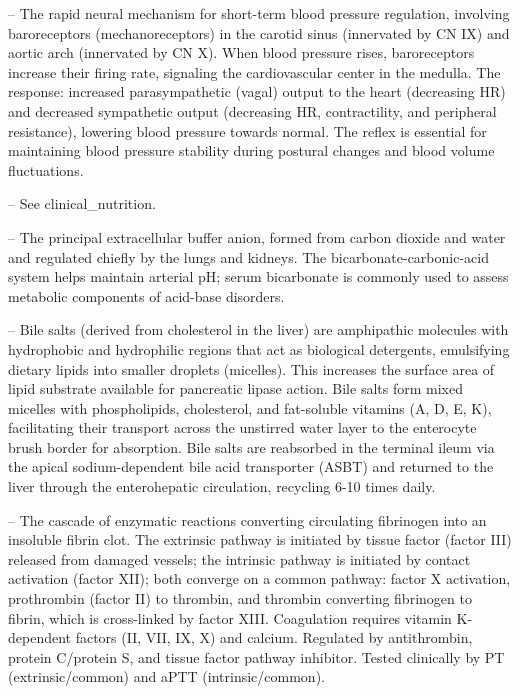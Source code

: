 -- The rapid neural mechanism for short-term blood pressure regulation, involving baroreceptors (mechanoreceptors) in the carotid sinus (innervated by CN IX) and aortic arch (innervated by CN X). When blood pressure rises, baroreceptors increase their firing rate, signaling the cardiovascular center in the medulla. The response: increased parasympathetic (vagal) output to the heart (decreasing HR) and decreased sympathetic output (decreasing HR, contractility, and peripheral resistance), lowering blood pressure towards normal. The reflex is essential for maintaining blood pressure stability during postural changes and blood volume fluctuations.

-- See clinical\_nutrition.

-- The principal extracellular buffer anion, formed from carbon dioxide and water and regulated chiefly by the lungs and kidneys. The bicarbonate-carbonic-acid system helps maintain arterial pH; serum bicarbonate is commonly used to assess metabolic components of acid-base disorders.

-- Bile salts (derived from cholesterol in the liver) are amphipathic molecules with hydrophobic and hydrophilic regions that act as biological detergents, emulsifying dietary lipids into smaller droplets (micelles). This increases the surface area of lipid substrate available for pancreatic lipase action. Bile salts form mixed micelles with phospholipids, cholesterol, and fat-soluble vitamins (A, D, E, K), facilitating their transport across the unstirred water layer to the enterocyte brush border for absorption. Bile salts are reabsorbed in the terminal ileum via the apical sodium-dependent bile acid transporter (ASBT) and returned to the liver through the enterohepatic circulation, recycling 6-10 times daily.

-- The cascade of enzymatic reactions converting circulating fibrinogen into an insoluble fibrin clot. The extrinsic pathway is initiated by tissue factor (factor III) released from damaged vessels; the intrinsic pathway is initiated by contact activation (factor XII); both converge on a common pathway: factor X activation, prothrombin (factor II) to thrombin, and thrombin converting fibrinogen to fibrin, which is cross-linked by factor XIII. Coagulation requires vitamin K-dependent factors (II, VII, IX, X) and calcium. Regulated by antithrombin, protein C/protein S, and tissue factor pathway inhibitor. Tested clinically by PT (extrinsic/common) and aPTT (intrinsic/common).

